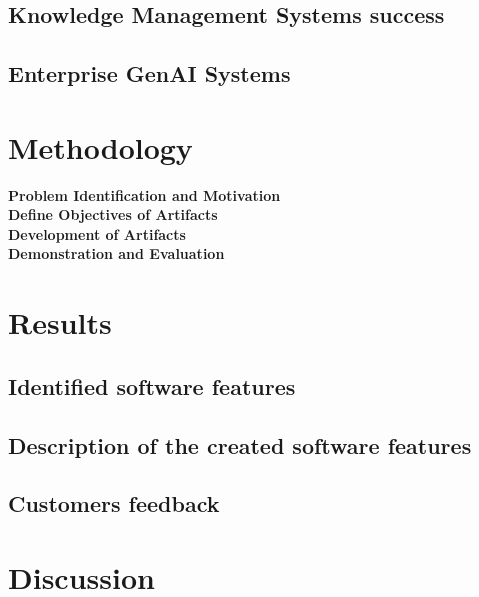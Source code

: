 \documentclass[
	english,
	ruledheaders=section,%
	class=report,%
	thesis={type=bachelor},%
	accentcolor=1b,%
	custommargins=true,%
	marginpar=false,%
	parskip=half-,%
	fontsize=11pt,%
	DIV=14,
]{tudapub}
\begin{document}
\section{Knowledge Management Systems success}
\section{Enterprise GenAI Systems}

\chapter{Methodology}
\textbf{Problem Identification and Motivation}\\
\textbf{Define Objectives of Artifacts}\\
\textbf{Development of Artifacts}\\
\textbf{Demonstration and Evaluation}\\
\chapter{Results}
\section{Identified software features}
\section{Description of the created software features}
\section{Customers feedback}

\chapter{Discussion}
\end{document}
